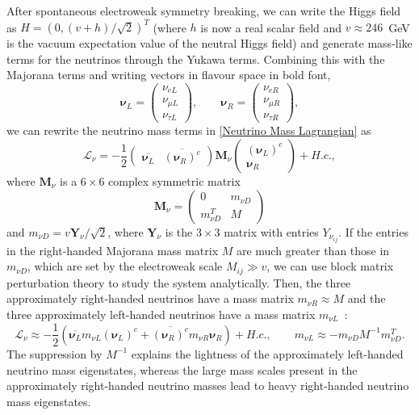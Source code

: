 \documentclass[11pt,letterpaper]{article}
\begin{document}
After spontaneous electroweak symmetry breaking, we can write the Higgs field
as $H = (0, (v+h)/\sqrt{2})^T$ (where $h$ is now a real scalar field and
$v\approx 246$~GeV
is the vacuum expectation value of the neutral Higgs field) and generate mass-like terms for the neutrinos through the Yukawa terms. Combining this with the Majorana terms and writing vectors in flavour space in bold font,
\begin{equation}
    \bm{\nu}_{L} =
    \begin{pmatrix}
        \nu_{eL} \\ \nu_{\mu L} \\ \nu_{\tau L}
    \end{pmatrix}, \qquad
    \bm{\nu}_{R} =
    \begin{pmatrix}
        \nu_{eR} \\ \nu_{\mu R} \\ \nu_{\tau R}
    \end{pmatrix},    
\end{equation}
we can rewrite the neutrino mass terms in \cref{Neutrino Mass Lagrangian} as 
\begin{equation}
    \mathcal{L}_\nu = - \frac{1}{2}\begin{pmatrix}
        \overline{\bm{\nu}_L} & \overline{(\bm{\nu}_R)^c}
    \end{pmatrix} \bm{M}_\nu \begin{pmatrix}
        {(\bm{\nu}_L)^c} \\ {\bm{\nu}_R}
    \end{pmatrix} + H.c.,
\end{equation}
where $\bm{M}_\nu$ is a $6 \times 6$ complex symmetric matrix
\begin{equation} \label{neutrino mass matrix}
    \bm{M}_\nu = \begin{pmatrix}
        0 & m_{\nu D} \\
        m_{\nu D}^T & M
    \end{pmatrix}
\end{equation}
and $m_{\nu D} = v\bm{Y}_\nu/\sqrt{2}$, where $\bm{Y}_\nu$ is the $3 \times 3$
matrix with entries $Y_{\nu_{ij}}$. If the entries in the
right-handed Majorana mass matrix $M$ are much greater than
those in $m_{\nu D}$, which are set by 
the electroweak
scale $M_{ij} \gg v$, we can use block matrix perturbation theory to study the
system analytically. Then, the three
approximately right-handed neutrinos have a mass matrix $m_{\nu R} \approx M$
and the three  approximately left-handed neutrinos have a mass matrix $m_{\nu L}$~\cite{Gell-Mann:1979vob, Minkowski:1977sc,Glashow:1979nm}:
\begin{equation}
  {\mathcal L}_\nu \approx -\frac{1}{2} \left(\overline{{\bm \nu}_L} m_{\nu L} ({\bm
    \nu}_L)^c + \overline{({\bm \nu}_R)^c}m_{\nu R} {\bm \nu}_R \right)+ H.c.,
  \qquad m_{\nu L}\approx -m_{\nu D} M^{-1} m_{\nu D}^T. \label{mnu_eff}
\end{equation}
The suppression by $M^{-1}$ explains the lightness of the approximately
left-handed neutrino mass eigenstates, whereas the large mass scales present
in the approximately right-handed neutrino masses lead to heavy right-handed
neutrino mass eigenstates.  
\end{document}

